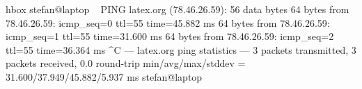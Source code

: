 \documentclass[border=10pt]{standalone}
\begin{document}
\begin{TermMac}{hbox}
stefan@laptop ~ %
PING latex.org (78.46.26.59): 56 data bytes
64 bytes from 78.46.26.59: icmp_seq=0 ttl=55 time=45.882 ms
64 bytes from 78.46.26.59: icmp_seq=1 ttl=55 time=31.600 ms
64 bytes from 78.46.26.59: icmp_seq=2 ttl=55 time=36.364 ms
^C
--- latex.org ping statistics ---
3 packets transmitted, 3 packets received, 0.0%
round-trip min/avg/max/stddev = 31.600/37.949/45.882/5.937 ms
stefan@laptop ~ %
\end{TermMac}
\end{document}
